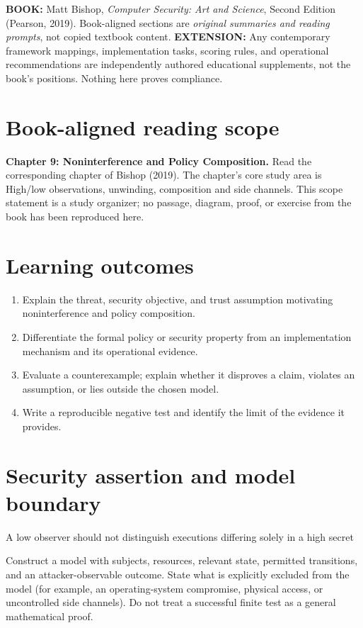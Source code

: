 \documentclass[10pt,letterpaper]{article}
\begin{document}
\makedoctocpage
\begin{notebox}
\textbf{BOOK:} Matt Bishop, \emph{Computer Security: Art and Science}, Second Edition (Pearson, 2019). Book-aligned sections are \emph{original summaries and reading prompts}, not copied textbook content.
\textbf{EXTENSION:} Any contemporary framework mappings, implementation tasks, scoring rules, and operational recommendations are independently authored educational supplements, not the book's positions. Nothing here proves compliance.
\end{notebox}
\section{Book-aligned reading scope}
\textbf{Chapter 9: Noninterference and Policy Composition.} Read the corresponding chapter of Bishop (2019). The chapter's core study area is High/low observations, unwinding, composition and side channels. This scope statement is a study organizer; no passage, diagram, proof, or exercise from the book has been reproduced here.
\section{Learning outcomes}
\begin{enumerate}
\item Explain the threat, security objective, and trust assumption motivating noninterference and policy composition.
\item Differentiate the formal policy or security property from an implementation mechanism and its operational evidence.
\item Evaluate a counterexample; explain whether it disproves a claim, violates an assumption, or lies outside the chosen model.
\item Write a reproducible negative test and identify the limit of the evidence it provides.
\end{enumerate}
\section{Security assertion and model boundary}
\begin{infobox}
A low observer should not distinguish executions differing solely in a high secret
\end{infobox}
Construct a model with subjects, resources, relevant state, permitted transitions, and an attacker-observable outcome. State what is explicitly excluded from the model (for example, an operating-system compromise, physical access, or uncontrolled side channels). Do not treat a successful finite test as a general mathematical proof.
\end{document}
